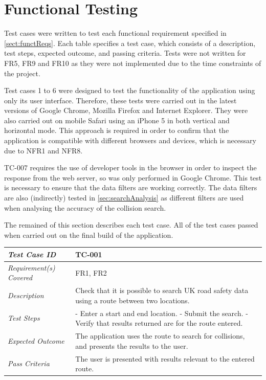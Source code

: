 \documentclass[authoryearcitations]{UoYCSproject}
\begin{document}
\section{Functional Testing}

Test cases were written to test each functional requirement specified in \autoref{sect:functReqs}. Each table specifies a test case, which consists of a description, test steps, expected outcome, and passing criteria. Tests were not written for FR5, FR9 and FR10 as they were not implemented due to the time constraints of the project.

Test cases 1 to 6 were designed to test the functionality of the application using only its user interface. Therefore, these tests were carried out in the latest versions of Google Chrome, Mozilla Firefox and Internet Explorer. They were also carried out on mobile Safari using an iPhone 5 in both vertical and horizontal mode. This approach is required in order to confirm that the application is compatible with different browsers and devices, which is necessary due to NFR1 and NFR8.

TC-007 requires the use of developer tools in the browser in order to inspect the response from the web server, so was only performed in Google Chrome. This test is necessary to ensure that the data filters are working correctly. The data filters are also (indirectly) tested in \autoref{sec:searchAnalysis} as different filters are used when analysing the accuracy of the collision search.

The remained of this section describes each test case. All of the test cases passed when carried out on the final build of the application.

\begin{tabular}{| p{2.5cm} | p{11cm} |}
	\hline
	\textit{Test Case ID} & TC-001 \\ \hline
	\textit{Requirement(s) Covered} & FR1, FR2 \\ \hline
	\textit{Description} & Check that it is possible to search UK road safety data using a route between two locations.  \\ \hline
	\textit{Test Steps}& - Enter a start and end location.
	\newline - Submit the search.
	\newline - Verify that results returned are for the route entered.
 \\ \hline
	\textit{Expected Outcome} & The application uses the route to search for collisions, and presents the results to the user.  \\ \hline
	\textit{Pass Criteria} & The user is presented with results relevant to the entered route.  \\ \hline
\end{tabular}
\end{document}
